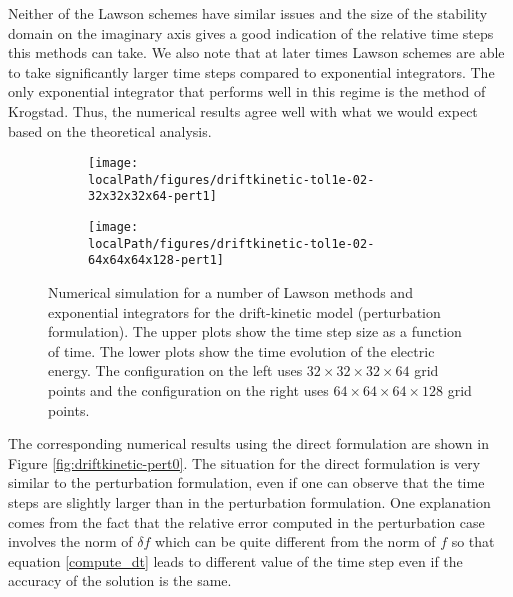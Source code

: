 Neither of the Lawson schemes have similar issues and the size of the stability domain on the imaginary axis gives a good indication of the relative time steps this methods can take. We also note that at later times Lawson schemes are able to take significantly larger time steps compared to exponential integrators. 
The only exponential integrator that performs well in this regime is the method of Krogstad. Thus, the numerical results agree well with what we would expect based on the theoretical analysis. 


\begin{figure}[h]
	\centering
	\begin{subfigure}[b]{0.48\textwidth}
        \centering \texttt{[image: \\localPath/figures/driftkinetic-tol1e-02-32x32x32x64-pert1]}%
	\end{subfigure}
	\begin{subfigure}[b]{0.48\textwidth}
        \centering \texttt{[image: \\localPath/figures/driftkinetic-tol1e-02-64x64x64x128-pert1]}%
	\end{subfigure}
    \caption{Numerical simulation for a number of Lawson methods and exponential integrators for the drift-kinetic model (perturbation formulation). The upper plots show the time step size as a function of time. The lower plots show the time evolution of the electric energy. The configuration on the left uses $32 \times 32 \times 32 \times 64$ grid points and the configuration on the right uses $64 \times 64 \times 64 \times 128$ grid points.}\label{fig:driftkinetic-pert1}
\end{figure}

The corresponding numerical results using the direct formulation are shown in Figure \ref{fig:driftkinetic-pert0}. The situation for the direct formulation is very similar to the perturbation formulation, even if one 
can observe that the time steps are slightly larger than in the perturbation formulation. 
One explanation comes from the fact that the relative error computed in the perturbation 
case involves the norm of $\delta f$ which can be quite different from the norm 
of $f$ so that equation \eqref{compute_dt} leads to different value of the time step 
even if the accuracy of the solution is the same.


